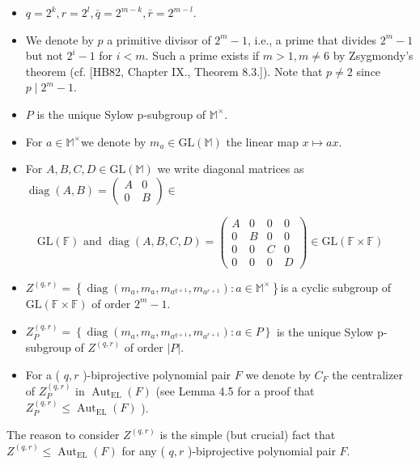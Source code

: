 \documentclass[10pt]{article}
\begin{document}
\begin{itemize}
  \item $q=2^{k}, r=2^{l}, \bar{q}=2^{m-k}, \bar{r}=2^{m-l}$.
  \item We denote by $p$ a primitive divisor of $2^{m}-1$, i.e., a prime that divides $2^{m}-1$ but not $2^{i}-1$ for $i<m$. Such a prime exists if $m>1, m \neq 6$ by Zsygmondy's theorem (cf. [HB82, Chapter IX., Theorem 8.3.]). Note that $p \neq 2$ since $p \mid 2^{m}-1$.
  \item $P$ is the unique Sylow p-subgroup of $\mathbb{M}^{\times}$.
  \item For $a \in \mathbb{M}^{\times}$we denote by $m_{a} \in \mathrm{GL}(\mathbb{M})$ the linear map $x \mapsto a x$.
  \item For $A, B, C, D \in \mathrm{GL}(\mathbb{M})$ we write diagonal matrices as $\operatorname{diag}(A, B)=\left(\begin{array}{cc}A & 0 \\ 0 & B\end{array}\right) \in$
\end{itemize}

$$
\mathrm{GL}(\mathbb{F}) \text { and } \operatorname{diag}(A, B, C, D)=\left(\begin{array}{cccc}
A & 0 & 0 & 0 \\
0 & B & 0 & 0 \\
0 & 0 & C & 0 \\
0 & 0 & 0 & D
\end{array}\right) \in \mathrm{GL}(\mathbb{F} \times \mathbb{F})
$$

\begin{itemize}
  \item $Z^{(q, r)}=\left\{\operatorname{diag}\left(m_{a}, m_{a}, m_{a^{q+1}}, m_{a^{r+1}}\right): a \in \mathbb{M}^{\times}\right\}$is a cyclic subgroup of $\mathrm{GL}(\mathbb{F} \times \mathbb{F})$ of order $2^{m}-1$.
  \item $Z_{P}^{(q, r)}=\left\{\operatorname{diag}\left(m_{a}, m_{a}, m_{a^{q+1}}, m_{a^{r+1}}\right): a \in P\right\}$ is the unique Sylow p-subgroup of $Z^{(q, r)}$ of order $|P|$.
  \item For a ( $q, r$ )-biprojective polynomial pair $F$ we denote by $C_{F}$ the centralizer of $Z_{P}^{(q, r)}$ in $\operatorname{Aut}_{\mathrm{EL}}(F)$ (see Lemma 4.5 for a proof that $Z_{P}^{(q, r)} \leqslant \operatorname{Aut}_{\mathrm{EL}}(F)$ ).
\end{itemize}

The reason to consider $Z^{(q, r)}$ is the simple (but crucial) fact that $Z^{(q, r)} \leqslant \operatorname{Aut}_{\mathrm{EL}}(F)$ for any ( $q, r$ )-biprojective polynomial pair $F$.
\end{document}
